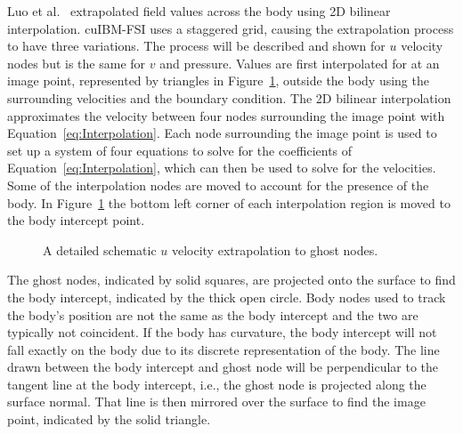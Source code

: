 Luo et al.~\cite{Luo:2012gx} extrapolated field values across the body using 2D bilinear interpolation. 
cuIBM-FSI uses a staggered grid, causing the extrapolation process to have three variations.
The process will be described and shown for $u$ velocity nodes but is the same for $v$ and pressure. 
Values are first interpolated for at an image point, represented by triangles in Figure~\ref{fig:Ghost node extrapolation}, outside the body using the surrounding velocities and the boundary condition. 
The 2D bilinear interpolation approximates the velocity between four nodes surrounding the image point with Equation~\eqref{eq:Interpolation}. 
Each node surrounding the image point is used to set up a system of four equations to solve for the coefficients of Equation~\eqref{eq:Interpolation}, which can then be used to solve for the velocities. 
Some of the interpolation nodes are moved to account for the presence of the body. 
In Figure~\ref{fig:Ghost node extrapolation} the bottom left corner of each interpolation region is moved to the body intercept point.
\begin{figure}[!htb]
	\centering
	
	\caption{A detailed schematic $u$ velocity extrapolation to ghost nodes.}
	\label{fig:Ghost node extrapolation}
\end{figure}

The ghost nodes, indicated by solid squares, are projected onto the surface to find the body intercept, indicated by the thick open circle. 
Body nodes used to track the body's position are not the same as the body intercept and the two are typically not coincident. 
If the body has curvature, the body intercept will not fall exactly on the body due to its discrete representation of the body. 
The line drawn between the body intercept and ghost node will be perpendicular to the tangent line at the body intercept, i.e., the ghost node is projected along the surface normal. 
That line is then mirrored over the surface to find the image point, indicated by the solid triangle. 

